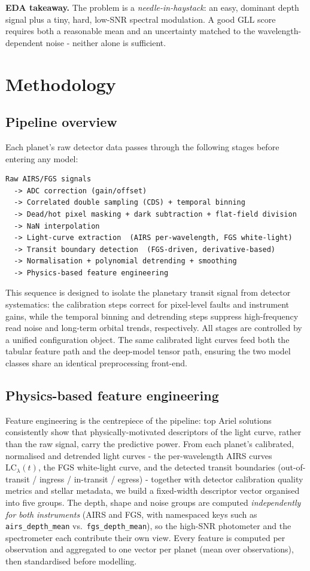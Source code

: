 \documentclass[12pt]{article}
\begin{document}
\textbf{EDA takeaway.} The problem is a \emph{needle-in-haystack}: an easy, dominant depth signal plus a tiny, hard, low-SNR spectral modulation. A good GLL score requires both a reasonable mean and an uncertainty matched to the wavelength-dependent noise - neither alone is sufficient.

\section{Methodology}

\subsection{Pipeline overview}

Each planet's raw detector data passes through the following stages before entering any model:

\begin{lstlisting}
Raw AIRS/FGS signals
  -> ADC correction (gain/offset)
  -> Correlated double sampling (CDS) + temporal binning
  -> Dead/hot pixel masking + dark subtraction + flat-field division
  -> NaN interpolation
  -> Light-curve extraction  (AIRS per-wavelength, FGS white-light)
  -> Transit boundary detection  (FGS-driven, derivative-based)
  -> Normalisation + polynomial detrending + smoothing
  -> Physics-based feature engineering
\end{lstlisting}

This sequence is designed to isolate the planetary transit signal from detector systematics: the calibration steps correct for pixel-level faults and instrument gains, while the temporal binning and detrending steps suppress high-frequency read noise and long-term orbital trends, respectively. All stages are controlled by a unified configuration object. The same calibrated light curves feed both the tabular feature path and the deep-model tensor path, ensuring the two model classes share an identical preprocessing front-end.

\subsection{Physics-based feature engineering}
\label{sec:features}

Feature engineering is the centrepiece of the pipeline: top Ariel solutions consistently show that physically-motivated descriptors of the light curve, rather than the raw signal, carry the predictive power. From each planet's calibrated, normalised and detrended light curves - the per-wavelength AIRS curves $\mathrm{LC}_\lambda(t)$, the FGS white-light curve, and the detected transit boundaries (out-of-transit / ingress / in-transit / egress) - together with detector calibration quality metrics and stellar metadata, we build a fixed-width descriptor vector organised into five groups. The depth, shape and noise groups are computed \emph{independently for both instruments} (AIRS and FGS, with namespaced keys such as \texttt{airs\_depth\_mean} vs.\ \texttt{fgs\_depth\_mean}), so the high-SNR photometer and the spectrometer each contribute their own view. Every feature is computed per observation and aggregated to one vector per planet (mean over observations), then standardised before modelling.
\end{document}
